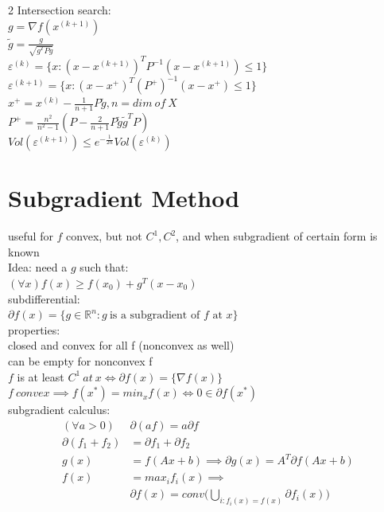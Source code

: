 \documentclass[8pt]{extarticle}
\newcommand{\R}{\mathbb{R}}
\newcommand{\set}[1]{\{#1\}}
\begin{document}
\begin{multicols*}{2}
  Intersection search:\\
  $g=\nabla f(x^{(k+1)})$\\
  $\tilde{g} = \frac{g}{\sqrt{g^TPg}}$\\
  $\varepsilon^{(k)} = \set{x: (x-x^{(k+1)})^T P^{-1} (x-x^{(k+1)}) \leq 1}$\\
  $\varepsilon^{(k+1)} = \set{x: (x-x^+)^T (P^+)^{-1} (x-x^+) \leq 1}$\\
  $x^+ = x^{(k)} - \frac{1}{n+1} P \tilde{g}, n=dim\ of\ X$\\
  $P^+ = \frac{n^2}{n^2-1}(P-\frac{2}{n+1} P \tilde{g}\tilde{g}^T P)$\\
  $Vol(\varepsilon^{(k+1)}) \leq e^{-\frac{1}{2n}} Vol(\varepsilon^{(k)})$\\
  \vfill\null
  \columnbreak
  \section{Subgradient Method}
  useful for $f$ convex, but not $C^{1},C^{2}$, and when subgradient of certain form is known\\
  
  Idea: need a $g$ such that:\\
  $(\forall x)f(x) \geq f(x_0)+g^T(x-x_0)$\\
  
  subdifferential:\\
  $\partial f(x)=\{ g \in \R^n: g\ \text{is a subgradient of }f \text{ at } x \}$\\

  properties:\\
  closed and convex for all f (nonconvex as well)\\
  can be empty for nonconvex f\\
  $f$ is at least $C^1\ at\ x \iff \partial f(x) = \{ \nabla f(x) \}$\\
  $f\ convex \implies f(x^*) = min_x f(x) \iff 0 \in \partial f(x^*)$\\
  
  subgradient calculus:
  \begin{align*}
    (\forall a>0) &\partial (af) = a \partial f\\
    \partial(f_1+f_2) &= \partial f_1 + \partial f_2\\
    g(x)&=f(Ax+b) \implies \partial g(x)=A^T \partial f(Ax+b)\\
    f(x)&=max_i f_i(x) \implies\\
        &\partial f(x)=conv\bigg(\bigcup_{i: f_i(x)=f(x)} \partial f_i(x)\bigg)
  \end{align*}


\end{multicols*}
\end{document}
